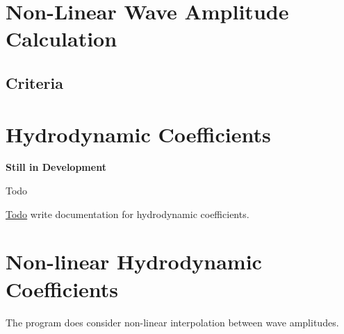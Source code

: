 \section*{Non-\/\-Linear Wave Amplitude Calculation}

\subsection*{Criteria}\hypertarget{hydrodynamic_coefficients}{}\section{Hydrodynamic Coefficients}\label{hydrodynamic_coefficients}
{\bfseries Still in Development}

\begin{DoxyRefDesc}{Todo}
\item[\hyperlink{todo__todo000046}{Todo}]write documentation for hydrodynamic coefficients.\end{DoxyRefDesc}


\section*{Non-\/linear Hydrodynamic Coefficients}

The program does consider non-\/linear interpolation between wave amplitudes. 